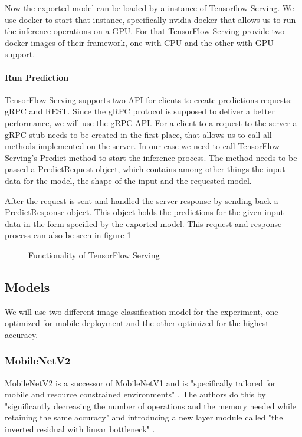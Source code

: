 Now the exported model can be loaded by a instance of Tensorflow Serving.
We use docker to start that instance, specifically nvidia-docker that allows us to run the inference operations on a GPU. For that TensorFlow Serving provide two docker images of their framework, one with CPU and the other with GPU support.

\paragraph{Run Prediction}
TensorFlow Serving supports two API for clients to create predictions requests: gRPC and REST. Since the gRPC protocol is supposed to deliver a better performance, we will use the gRPC API.
For a client to a request to the server a gRPC stub needs to be created in the first place, that allows us to call all methods implemented on the server. In our case we need to call TensorFlow Serving's Predict method to start the inference process. The method needs to be passed a PredictRequest object, which contains among other things the input data for the model, the shape of the input and the requested model.%

After the request is sent and handled the server response by sending back a PredictResponse object. This object holds the predictions for the given input data in the form specified by the exported model.
This request and response process can also be seen in figure \ref{fig:cloud}

\begin{figure}[H]
\centering

\caption{Functionality of TensorFlow Serving}
\label{fig:cloud}
\end{figure}
\subsection{Models}
We will use two different image classification model for the experiment, one optimized for mobile deployment and the other optimized for the highest accuracy.

\subsubsection{MobileNetV2}
MobileNetV2 is a successor of MobileNetV1 and is "specifically tailored for mobile and resource
constrained environments" \cite{DBLP:journals/corr/abs-1801-04381}. The authors do this by "significantly decreasing the number of operations and the memory needed while retaining the same accuracy"  \cite{DBLP:journals/corr/abs-1801-04381} and introducing a new layer module called "the
inverted residual with linear bottleneck" \cite{DBLP:journals/corr/abs-1801-04381}.

